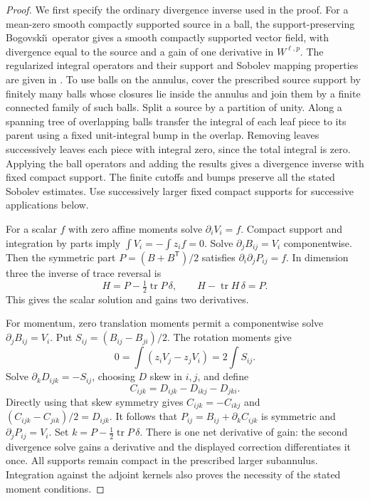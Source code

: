 \begin{proof}
We first specify the ordinary divergence inverse used in the proof.
For a mean-zero smooth compactly supported source in a ball, the
support-preserving Bogovski\u\i\ operator gives a smooth compactly
supported vector field, with divergence equal to the source and a
gain of one derivative in $W^{\ell,p}$. The regularized integral
operators and their support and Sobolev mapping properties are
given in \cite[Theorems~3.2 and~4.9, Corollary~4.11]{CostabelMcIntosh2010}.
To use balls on the annulus,
cover the prescribed source support by finitely many balls whose
closures lie inside the annulus and join them by a finite connected
family of such balls. Split a source by a partition of unity.
Along a spanning tree of overlapping balls transfer the integral
of each leaf piece to its parent using a fixed unit-integral bump
in the overlap. Removing leaves successively leaves each piece
with integral zero, since the total integral is zero. Applying the
ball operators and adding the results gives a divergence inverse
with fixed compact support. The finite cutoffs and bumps preserve
all the stated Sobolev estimates. Use successively larger fixed
compact supports for successive applications below.

For a scalar $f$ with zero affine moments solve $\partial_iV_i=f$.
Compact support and integration by parts imply
$\int V_i=-\int z_i f=0$. Solve
$\partial_j B_{ij}=V_i$ componentwise. Then the symmetric part
$P=(B+B^{\mathsf T})/2$ satisfies
$\partial_i\partial_jP_{ij}=f$. In dimension three the inverse
of trace reversal is
\[
 H=P-\tfrac12\operatorname{tr}P\,\delta,
 \qquad H-\operatorname{tr}H\,\delta=P.
\]
This gives the scalar solution and gains two derivatives.

For momentum, zero translation moments permit a componentwise solve
$\partial_jB_{ij}=V_i$. Put $S_{ij}=(B_{ij}-B_{ji})/2$.
The rotation moments give
\[
 0=\int(z_iV_j-z_jV_i)=2\int S_{ij}.
\]
Solve $\partial_kD_{ijk}=-S_{ij}$, choosing $D$ skew in $i,j$,
and define
\[
 C_{ijk}=D_{ijk}-D_{ikj}-D_{jki}.
\]
Directly using that skew symmetry gives
$C_{ijk}=-C_{ikj}$ and
$(C_{ijk}-C_{jik})/2=D_{ijk}$. It follows that
$P_{ij}=B_{ij}+\partial_kC_{ijk}$ is symmetric and
$\partial_jP_{ij}=V_i$. Set
$k=P-\tfrac12\operatorname{tr}P\,\delta$.
There is one net derivative of gain: the second divergence solve
gains a derivative and the displayed correction differentiates
it once. All supports remain compact in the prescribed larger
subannulus. Integration against the adjoint kernels also proves
the necessity of the stated moment conditions.
\end{proof}

